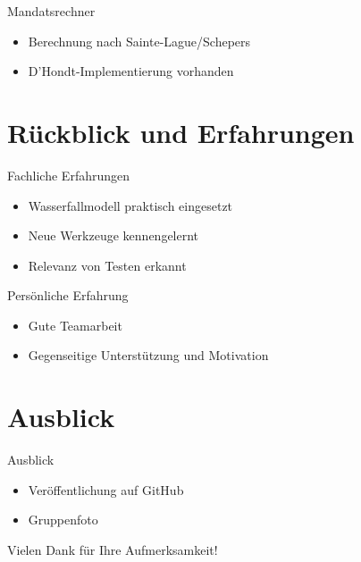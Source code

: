 \documentclass[18pt]{beamer}
\begin{document}
\begin{frame}{Mandatsrechner}
\begin{itemize}
	\item Berechnung nach Sainte-Lague/Schepers
	\item D'Hondt-Implementierung vorhanden
\end{itemize}
\end{frame}

\section{Rückblick und Erfahrungen}
\begin{frame}{Fachliche Erfahrungen}
\begin{itemize}
	\item Wasserfallmodell praktisch eingesetzt
	\item Neue Werkzeuge kennengelernt
	\item Relevanz von Testen erkannt
\end{itemize}
\end{frame}

\begin{frame}{Persönliche Erfahrung}
\begin{itemize}
	\item Gute Teamarbeit
	\item Gegenseitige Unterstützung und Motivation
\end{itemize}
\end{frame}

\section{Ausblick}
\begin{frame}{Ausblick}
\begin{itemize}
	\item Veröffentlichung auf GitHub
	\item Gruppenfoto
\end{itemize}
\end{frame}

\appendix

\begin{frame}{}

\begin{LARGE}
\begin{center}
	Vielen Dank für Ihre Aufmerksamkeit!
\end{center}
\end{LARGE}
\end{frame}
\end{document}

